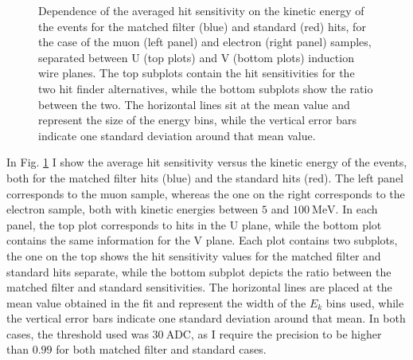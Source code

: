 \begin{figure}[t]
\begin{subfigure}{0.5\textwidth}
	\end{subfigure}
	\caption[Dependence of the averaged hit sensitivity on the kinetic energy of the events for the matched filter and standard hits, for the case of the muon and electron samples.]{Dependence of the averaged hit sensitivity on the kinetic energy of the events for the matched filter (blue) and standard (red) hits, for the case of the muon (left panel) and electron (right panel) samples, separated between U (top plots) and V (bottom plots) induction wire planes. The top subplots contain the hit sensitivities for the two hit finder alternatives, while the bottom subplots show the ratio between the two. The horizontal lines sit at the mean value and represent the size of the energy bins, while the vertical error bars indicate one standard deviation around that mean value.}
	\label{fig:sensitivity_energy}
\end{figure}

In Fig. \ref{fig:sensitivity_energy} I show the average hit sensitivity versus the kinetic energy of the events, both for the matched filter hits (blue) and the standard hits (red). The left panel corresponds to the muon sample, whereas the one on the right corresponds to the electron sample, both with kinetic energies between $5$ and $100 \ \mathrm{MeV}$. In each panel, the top plot corresponds to hits in the U plane, while the bottom plot contains the same information for the V plane. Each plot contains two subplots, the one on the top shows the hit sensitivity values for the matched filter and standard hits separate, while the bottom subplot depicts the ratio between the matched filter and standard sensitivities. The horizontal lines are placed at the mean value obtained in the fit and represent the width of the $E_{k}$ bins used, while the vertical error bars indicate one standard deviation around that mean. In both cases, the threshold used was $30 \ \mathrm{ADC}$, as I require the precision to be higher than $0.99$ for both matched filter and standard cases.

